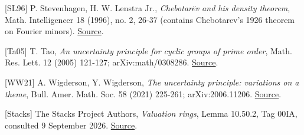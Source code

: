 \documentclass[
  11pt,
  a4paper,
]{article}
\begin{document}
{[}SL96{]} P. Stevenhagen, H. W. Lenstra Jr., \emph{Chebotarëv and his
density theorem}, Math. Intelligencer 18 (1996), no. 2, 26-37 (contains
Chebotarev's 1926 theorem on Fourier minors).
\href{https://pub.math.leidenuniv.nl/~lenstrahw/PUBLICATIONS/1996d/art.pdf}{Source}.

{[}Ta05{]} T. Tao, \emph{An uncertainty principle for cyclic groups of
prime order}, Math. Res. Lett. 12 (2005) 121-127; arXiv:math/0308286.
\href{https://arxiv.org/abs/math/0308286}{Source}.

{[}WW21{]} A. Wigderson, Y. Wigderson, \emph{The uncertainty principle:
variations on a theme}, Bull. Amer. Math. Soc. 58 (2021) 225-261;
arXiv:2006.11206. \href{https://arxiv.org/abs/2006.11206}{Source}.

{[}Stacks{]} The Stacks Project Authors, \emph{Valuation rings}, Lemma
10.50.2, Tag 00IA, consulted 9 September 2026.
\href{https://stacks.math.columbia.edu/tag/00IA}{Source}.
\end{document}
